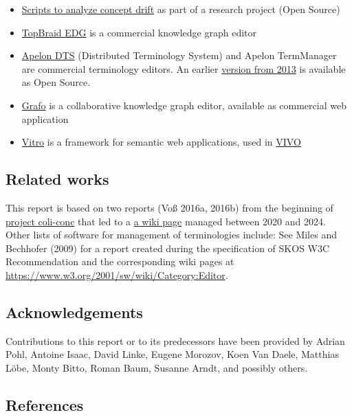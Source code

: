 \documentclass[
  DIV=10]{article}
\providecommand{\tightlist}{%
  \setlength{\itemsep}{0pt}\setlength{\parskip}{0pt}}\usepackage{longtable,booktabs,array}
\begin{document}
\begin{itemize}
\tightlist
\item
  \href{https://github.com/Multilingual-LGBTQIA-Vocabularies/Examing_LGBTQ_Concepts}{Scripts
  to analyze concept drift} as part of a research project (Open Source)
\item
  \href{https://www.topquadrant.com/topbraid-edg/}{TopBraid EDG} is a
  commercial knowledge graph editor
\item
  \href{https://www.apelondts.org/}{Apelon DTS} (Distributed Terminology
  System) and Apelon TermManager are commercial terminology editors. An
  earlier \href{https://apelon-dts.sourceforge.net/}{version from 2013}
  is available as Open Source.
\item
  \href{https://gra.fo/}{Grafo} is a collaborative knowledge graph
  editor, available as commercial web application
\item
  \href{https://github.com/vivo-project/Vitro}{Vitro} is a framework for
  semantic web applications, used in \href{https://vivoweb.org/}{VIVO}
\end{itemize}

\subsection{Related works}\label{related-works}

This report is based on two reports (Voß 2016a, 2016b) from the
beginning of \href{https://coli-conc.gbv.de/}{project coli-conc} that
led to a
\href{https://github.com/gbv/bartoc.org/wiki/Software-for-controlled-vocabularies}{a
wiki page} managed between 2020 and 2024. Other lists of software for
management of terminologies include: See Miles and Bechhofer (2009) for
a report created during the specification of SKOS W3C Recommendation and
the corresponding wiki pages at
\url{https://www.w3.org/2001/sw/wiki/Category:Editor}.

\subsection{Acknowledgements}\label{acknowledgements}

Contributions to this report or to its predecessors have been provided
by Adrian Pohl, Antoine Isaac, David Linke, Eugene Morozov, Koen Van
Daele, Matthias Löbe, Monty Bitto, Roman Baum, Susanne Arndt, and
possibly others.

\subsection{References}\label{references}
\end{document}
